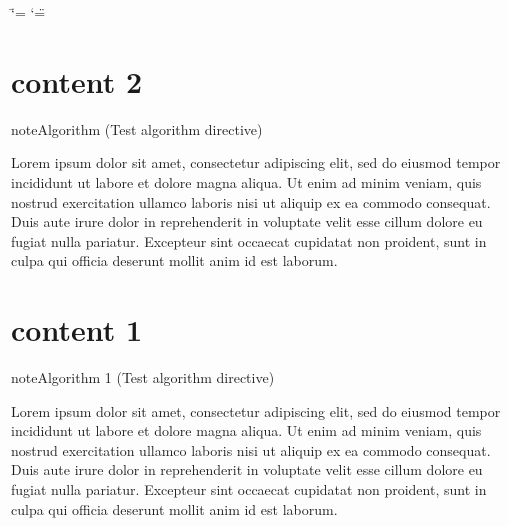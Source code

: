 

\ifdefined\shorthandoff
  \ifnum\catcode`\=\string=\active\shorthandoff{=}\fi
  \ifnum\catcode`\"=\active{}\fi
\fi

\pagestyle{empty}
\sphinxmaketitle
\pagestyle{plain}
\sphinxtableofcontents
\pagestyle{normal}
\label{\detokenize{index::doc}}


\sphinxstepscope


\chapter{content 2}
\label{\detokenize{algorithm/_algo_nonumber:content-2}}\label{\detokenize{algorithm/_algo_nonumber::doc}}\label{algorithm/_algo_nonumber:algorithm-_algo_nonumber-algorithm-0}
\begin{sphinxadmonition}{note}{Algorithm (Test algorithm directive)}



\sphinxAtStartPar
Lorem ipsum dolor sit amet, consectetur adipiscing elit, sed do eiusmod tempor incididunt ut labore et dolore magna aliqua. Ut enim ad minim veniam, quis nostrud exercitation ullamco laboris nisi ut aliquip ex ea commodo consequat. Duis aute irure dolor in reprehenderit in voluptate velit esse cillum dolore eu fugiat nulla pariatur. Excepteur sint occaecat cupidatat non proident, sunt in culpa qui officia deserunt mollit anim id est laborum.
\end{sphinxadmonition}

\sphinxstepscope


\chapter{content 1}
\label{\detokenize{algorithm/_algo_labeled_titled_with_classname:content-1}}\label{\detokenize{algorithm/_algo_labeled_titled_with_classname::doc}}\label{algorithm/_algo_labeled_titled_with_classname:test-algo-label}
\begin{sphinxadmonition}{note}{Algorithm 1 (Test algorithm directive)}



\sphinxAtStartPar
Lorem ipsum dolor sit amet, consectetur adipiscing elit, sed do eiusmod tempor incididunt ut labore et dolore magna aliqua. Ut enim ad minim veniam, quis nostrud exercitation ullamco laboris nisi ut aliquip ex ea commodo consequat. Duis aute irure dolor in reprehenderit in voluptate velit esse cillum dolore eu fugiat nulla pariatur. Excepteur sint occaecat cupidatat non proident, sunt in culpa qui officia deserunt mollit anim id est laborum.
\end{sphinxadmonition}

